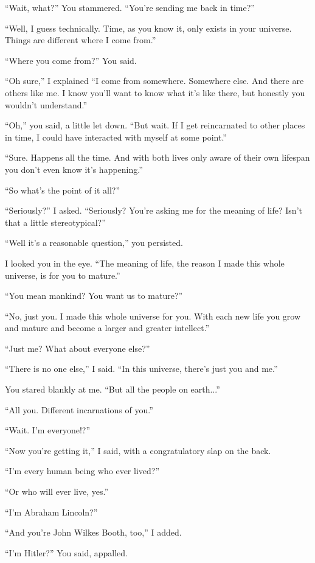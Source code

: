 “Wait, what?” You stammered. “You're sending me back in time?”

“Well, I guess technically. Time, as you know it, only exists in your universe. Things are different where I come from.”

“Where you come from?” You said.

“Oh sure,” I explained “I come from somewhere. Somewhere else. And there are others like me. I know you'll want to know what it's like there, but honestly you wouldn't understand.”

“Oh,” you said, a little let down. “But wait. If I get reincarnated to other places in time, I could have interacted with myself at some point.”

“Sure. Happens all the time. And with both lives only aware of their own lifespan you don't even know it's happening.”

“So what's the point of it all?”


“Seriously?” I asked. “Seriously? You're asking me for the meaning of life? Isn't that a little stereotypical?”

“Well it's a reasonable question,” you persisted.

I looked you in the eye. “The meaning of life, the reason I made this whole universe, is for you to mature.”

“You mean mankind? You want us to mature?”

“No, just you. I made this whole universe for you. With each new life you grow and mature and become a larger and greater intellect.”

“Just me? What about everyone else?”

“There is no one else,” I said. “In this universe, there's just you and me.”

You stared blankly at me. “But all the people on earth...”

“All you. Different incarnations of you.”

“Wait. I'm everyone!?”

“Now you're getting it,” I said, with a congratulatory slap on the back.

“I'm every human being who ever lived?”

“Or who will ever live, yes.”

“I'm Abraham Lincoln?”

“And you're John Wilkes Booth, too,” I added.

“I'm Hitler?” You said, appalled.

